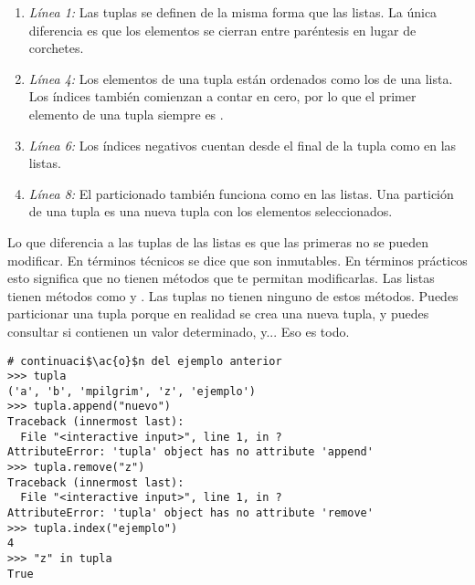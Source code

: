 \begin{enumerate}

\item \emph{Línea 1:} Las tuplas se definen de la misma forma que las listas. La única diferencia es que los elementos se cierran entre paréntesis en lugar de corchetes.

\item \emph{Línea 4:} Los elementos de una tupla están ordenados como los de una lista. Los índices también comienzan a contar en cero, por lo que el primer elemento de una tupla siempre es .

\item \emph{Línea 6:} Los índices negativos cuentan desde el final de la tupla como en las listas.

\item \emph{Línea 8:} El particionado también funciona como en las listas. Una partición de una tupla es una nueva tupla con los elementos seleccionados.

\end{enumerate}

Lo que diferencia a las tuplas de las listas es que las primeras no se pueden modificar. En términos técnicos se dice que son inmutables. En términos prácticos esto significa que no tienen métodos que te permitan modificarlas. Las listas tienen métodos como  y . Las tuplas no tienen ninguno de estos métodos. Puedes particionar una tupla porque en realidad se crea una nueva tupla, y puedes consultar si contienen un valor determinado, y... Eso es todo.

\noindent\begin{minipage}{\textwidth}
\begin{lstlisting}[mathescape=True]
# continuaci$\ac{o}$n del ejemplo anterior
>>> tupla
('a', 'b', 'mpilgrim', 'z', 'ejemplo')
>>> tupla.append("nuevo")
Traceback (innermost last):
  File "<interactive input>", line 1, in ?
AttributeError: 'tupla' object has no attribute 'append'
>>> tupla.remove("z")
Traceback (innermost last):
  File "<interactive input>", line 1, in ?
AttributeError: 'tupla' object has no attribute 'remove'
>>> tupla.index("ejemplo")
4
>>> "z" in tupla
True
\end{lstlisting}
\end{minipage}


